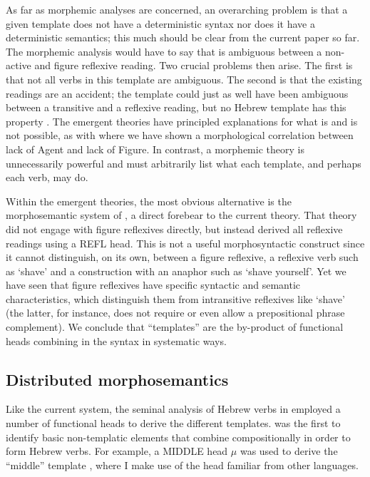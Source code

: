 As far as morphemic analyses are concerned, an overarching problem is that a given template does not have a deterministic syntax nor does it have a deterministic semantics; this much should be clear from the current paper so far. The morphemic analysis would have to say that {\tnif} is ambiguous between a non-active and figure reflexive reading. Two crucial problems then arise. The first is that not all verbs in this template are ambiguous. The second is that the existing readings are an accident; the template could just as well have been ambiguous between a transitive and a reflexive reading, but no Hebrew template has this property \citep{doron05,kastner16phd}. The emergent theories have principled explanations for what is and is not possible, as with {\tnif} where we have shown a morphological correlation between lack of Agent and lack of Figure. In contrast, a morphemic theory is unnecessarily powerful and must arbitrarily list what each template, and perhaps each verb, may do.

Within the emergent theories, the most obvious alternative is the morphosemantic system of \cite{doron03}, a direct forebear to the current theory. That theory did not engage with figure reflexives directly, but instead derived all reflexive readings using a REFL head. This is not a useful morphosyntactic construct since it cannot distinguish, on its own, between a figure reflexive, a reflexive verb such as `shave’ and a construction with an anaphor such as `shave yourself’. Yet we have seen that figure reflexives have specific syntactic and semantic characteristics, which distinguish them from intransitive reflexives like `shave’ (the latter, for instance, does not require or even allow a prepositional phrase complement). We conclude that “templates” are the by-product of functional heads combining in the syntax in systematic ways.


	\subsection{Distributed morphosemantics \citep{doron03}} \label{vz:others:ed}
Like the current system, the seminal analysis of Hebrew verbs in \cite{doron03} employed a number of functional heads to derive the different templates. \cite{doron03} was the first to identify basic non-templatic elements that combine compositionally in order to form Hebrew verbs. For example, a MIDDLE head $\mu$ was used to derive the ``middle'' template {\tnif}, where I make use of the head {\vz} familiar from other languages.

